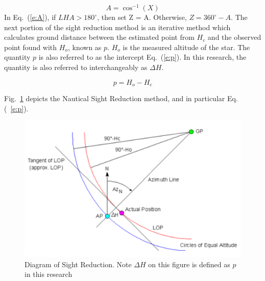 \documentclass[12pt,a4paper]{book}
\begin{document}
\begin{equation}
 \label{e:A}
    A = \cos^{-1}(X)
\end{equation}
In Eq.~(\ref{e:A}), if $LHA > 180^{\circ}$, then set Z = A.  Otherwise, $Z = 360^{\circ} -A$.  The next portion of the sight reduction method is an iterative method which calculates ground distance between the estimated point from $H_c$ and the observed point found with $H_{o}$, known as $p$.  $H_{o}$ is the measured altitude of the star.  The quantity $p$ is also referred to as the intercept Eq.~(\ref{e:p}).  In this research, the quantity is also referred to interchangeably as $\Delta H$. 

\begin{equation}
 \label{e:p}
    p = H_{o} - H_{c}
\end{equation}

Fig.~\ref{f:pdeltah} depicts the Nautical Sight Reduction method, and in particular Eq.(~\ref{e:p}).  

\begin{figure}[!ht]
\centering
\includegraphics[width=12cm]{pdeltah.png}
\caption{Diagram of Sight Reduction.  Note $\Delta H$ on this figure is defined as $p$ in this research \cite{b:celnavde}}
\label{f:pdeltah}
\end{figure} 
\FloatBarrier
\end{document}
